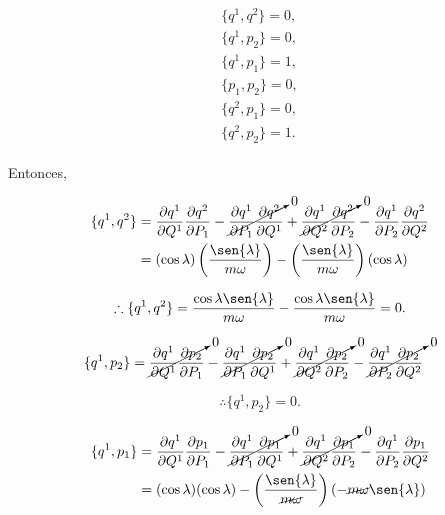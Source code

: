 \documentclass[a4paper,10pt]{article}
\numberwithin{equation}{section}
\begin{document}
\begin{align}
 \begin{split}
  \{q^1,q^2\} = 0, \\
  \{q^1,p_2\} = 0, \\
  \{q^1,p_1\} = 1, \\
  \{p_1,p_2\} = 0, \\
  \{q^2,p_1\} = 0, \\
  \{q^2,p_2\} = 1.
 \end{split}
\end{align}

Entonces, 

\begin{align*}
  \{q^1,q^2\} &= \frac{\partial q^1}{\partial Q^1}\frac{\partial q^2}{\partial P_1} - 
 \cancelto{0}{\frac{\partial q^1}{\partial P_1}\frac{\partial q^2}{\partial Q^1}} + 
 \cancelto{0}{\frac{\partial q^1}{\partial Q^2}\frac{\partial q^2}{\partial P_2}} -
 \frac{\partial q^1}{\partial P_2}\frac{\partial q^2}{\partial Q^2} \\
 &= (\cos{\lambda})\left(\frac{\sen{\lambda}}{m\omega}\right) - 
 \left(\frac{\sen{\lambda}}{m\omega}\right)(\cos{\lambda}) 
\end{align*}

\begin{equation}
 \therefore  \{q^1,q^2\} =  \frac{\cos{\lambda}\sen{\lambda}}{m\omega} -
 \frac{\cos{\lambda}\sen{\lambda}}{m\omega} =0.
\end{equation}

\begin{align*}
 \{q^1,p_2\} &= \cancelto{0}{\frac{\partial q^1}{\partial Q^1}\frac{\partial p_2}{\partial P_1}} - 
 \cancelto{0}{\frac{\partial q^1}{\partial P_1}\frac{\partial p_2}{\partial Q^1}} + 
 \cancelto{0}{\frac{\partial q^1}{\partial Q^2}\frac{\partial p_2}{\partial P_2}} -
 \cancelto{0}{\frac{\partial q^1}{\partial P_2}\frac{\partial p_2}{\partial Q^2}}
\end{align*}

\begin{equation}
 \therefore  \{q^1,p_2\} = 0.
\end{equation}


\begin{align*}
 \{q^1,p_1\} &= \frac{\partial q^1}{\partial Q^1}\frac{\partial p_1}{\partial P_1} - 
 \cancelto{0}{\frac{\partial q^1}{\partial P_1}\frac{\partial p_1}{\partial Q^1}} + 
 \cancelto{0}{\frac{\partial q^1}{\partial Q^2}\frac{\partial p_1}{\partial P_2}} -
 \frac{\partial q^1}{\partial P_2}\frac{\partial p_1}{\partial Q^2} \\
 &= (\cos{\lambda})(\cos{\lambda}) - \left(\frac{\sen{\lambda}}{\cancel{m\omega}}\right)
 (- \cancel{m\omega} \sen{\lambda})
\end{align*}
\end{document}
